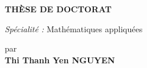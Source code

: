 \documentclass[12pt,a4paper]{article}
\begin{document}
\begin{center}
\end{center}

\vspace{5mm}

\begin{center}
{\Large\bf TH\`ESE DE DOCTORAT }
\end{center}

\vspace{2mm}

\begin{center}
{\it Sp\'ecialit\'e : } 
{\large Math\'ematiques appliqu\'ees}
\end{center}

\vspace{5mm}

\begin{center}
par\\
\vspace{3mm}
{\large\bf Thi Thanh Yen NGUYEN}
\end{center}
\end{document}
